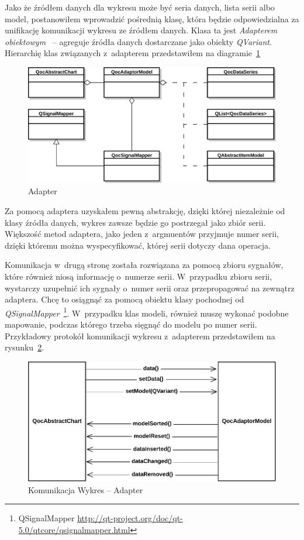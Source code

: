 Jako że źródłem danych dla wykresu może być seria danych, lista serii albo model, postanowiłem wprowadzić pośrednią klasę, która będzie odpowiedzialna za unifikację komunikacji wykresu ze źródłem danych. Klasa ta jest \textit{Adapterem obiektowym}~\cite{Patterns} -- agreguje źródła danych dostarczane jako obiekty \textit{QVariant}. Hierarchię klas związanych z~adapterem przedstawiłem na diagramie~\ref{rys:adapter:model}

\begin{figure}[H]
\centering
\includegraphics[scale=0.8]{img/adapter-model.pdf}
\caption{Adapter}\label{rys:adapter:model}
\end{figure}

Za pomocą adaptera uzyskałem pewną abstrakcję, dzięki której niezależnie od klasy źródła danych, wykres zawsze będzie go postrzegał jako zbiór serii. Większość metod adaptera, jako jeden z~argmuentów przyjmuje numer serii, dzięki któremu można wyspecyfikować, której serii dotyczy dana operacja. 

Komunikacja w~drugą stronę została rozwiązana za pomocą zbioru sygnałów, które również niosą informację o~numerze serii. W~przypadku zbioru serii, wystarczy uzupełnić ich sygnały o~numer serii oraz przepropagować na zewnątrz adaptera. Chcę to osiągnąć za pomocą obiektu klasy pochodnej od \textit{QSignalMapper}~\footnote{QSignalMapper \url{http://qt-project.org/doc/qt-5.0/qtcore/qsignalmapper.html}}. W~przypadku klas modeli, również muszę wykonać podobne mapowanie, podczas którego trzeba sięgnąć do modelu po numer serii. Przykładowy protokół komunikacji wykresu z~adapterem przedstawiłem na rysunku~\ref{rys:wykres:model}.

\begin{figure}[H]
\centering
\includegraphics[scale=0.8]{img/wykres-model.pdf}
\caption{Komunikacja Wykres -- Adapter}\label{rys:wykres:model}
\end{figure}

